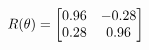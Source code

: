\documentclass[preview]{standalone}
\begin{document}
\begin{align*}
\special{dvisvgm:raw <g id='unique000'>}R(\theta) = \begin{bmatrix}0.96 & -0.28\\0.28 & 0.96\end{bmatrix}\special{dvisvgm:raw </g>}
\end{align*}
\end{document}
